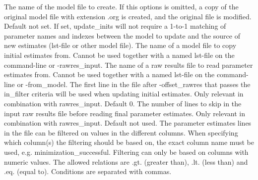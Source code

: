 \begin{optionlist}
The name of the model file to create. If this options is omitted, a copy of
the original model file with extension .org is created, and 
the original file is modified.
\nextopt
{}
Default not set. If set, update\_inits will not require 
a 1-to-1 matching of parameter names and indexes between the model to update and the source
of new estimates (lst-file or other model file).
\nextopt
{}
The name of a model file to copy initial estimates from. 
Cannot be used together with a named lst-file on the command-line or -rawres\_input.
\nextopt
{}
The name of a raw results file to read parameter estimates from. 
Cannot be used together with a named lst-file on the command-line or -from\_model.
The first line in the file after -offset\_rawres that passes the in\_filter criteria
will be used when updating initial estimates.
Only relevant in combination with rawres\_input. Default 0.
The number of lines to skip in the input raw results file
before reading final parameter estimates.
Only relevant in combination with rawres\_input. Default not used.
The parameter estimates lines in the file can be filtered on values 
in the different columns. When specifying which column(s) the filtering 
should be based on, the exact column name must be used, 
e.g. minimization\_successful. Filtering can only be based on columns 
with numeric values. The allowed relations are .gt. (greater than), 
.lt. (less than) and .eq. (equal to). Conditions are separated with commas. 
    

\end{optionlist}
